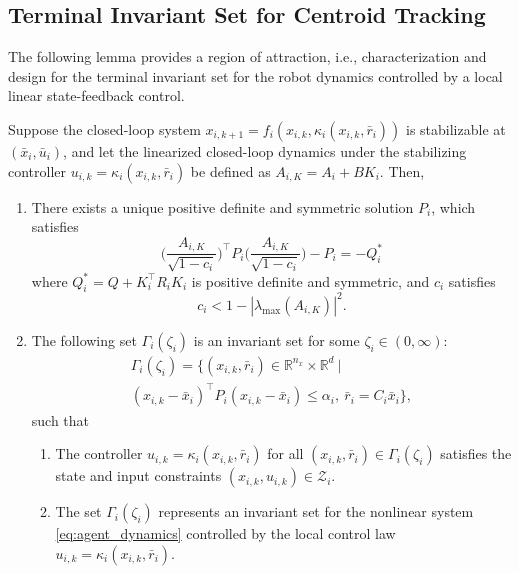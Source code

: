 \subsection{Terminal Invariant Set for Centroid Tracking}
The following lemma \cite{chen1998quasi} provides a region of attraction, i.e., characterization and design for the terminal invariant set for the robot dynamics controlled by a local linear state-feedback control.
\begin{lemma}
Suppose the closed-loop system $x_{i,k+1} = f_i(x_{i,k}, \kappa_i(x_{i,k}, \bar{r}_i))$ is stabilizable at $(\bar{x}_i, \bar{u}_i)$, and let the linearized closed-loop dynamics under the stabilizing controller $u_{i,k} = \kappa_i(x_{i,k}, \bar{r}_i)$ be defined as $A_{i,K} = A_i+BK_i$. Then,
\begin{enumerate}
    \item There exists a unique positive definite and symmetric solution $P_i$, which satisfies
    \begin{equation}
        \biggl(\frac{A_{i,K}}{\sqrt{1-c_i}}\biggr)^\top P_i\biggl(\frac{A_{i,K}}{\sqrt{1-c_i}}\biggr) - P_i = -Q_i^*
    \end{equation}
    where $Q_i^* = Q + K_i^\top R_i K_i$ is positive definite and symmetric, and $c_i$ satisfies 
    \begin{equation*}
        c_i < 1 - |\lambda_{\text{max}}(A_{i,K})|^2.
    \end{equation*}
    \item The following set $\Gamma_i(\zeta_i)$ is an invariant set for some $\zeta_i\in (0, \infty)$:
    \begin{multline*}
        \Gamma_i(\zeta_i) = \{ (x_{i,k},\bar{r}_i) \in \mathbb{R}^{n_x}\times \mathbb{R}^{d} \ | \\ (x_{i,k} - \bar{x}_i)^\top P_i (x_{i,k} - \bar{x}_i) \leq \alpha_i, \  \bar{r}_i = C_i\bar{x}_i\},
    \end{multline*}
    such that 
    \begin{enumerate}
        \item The controller $u_{i,k} = \kappa_i(x_{i,k}, \bar{r}_i)$ for all $(x_{i,k}, \bar{r}_i) \in \Gamma_i(\zeta_i)$ satisfies the state and input constraints  $(x_{i,k}, u_{i,k}) \in \mathcal{Z}_i$.
        \item The set $\Gamma_i(\zeta_i)$ represents an invariant set for the nonlinear system \eqref{eq:agent_dynamics} controlled by the local control law $u_{i,k} = \kappa_i(x_{i,k}, \bar{r}_i)$.

\end{enumerate}
\end{enumerate}
\end{lemma}
